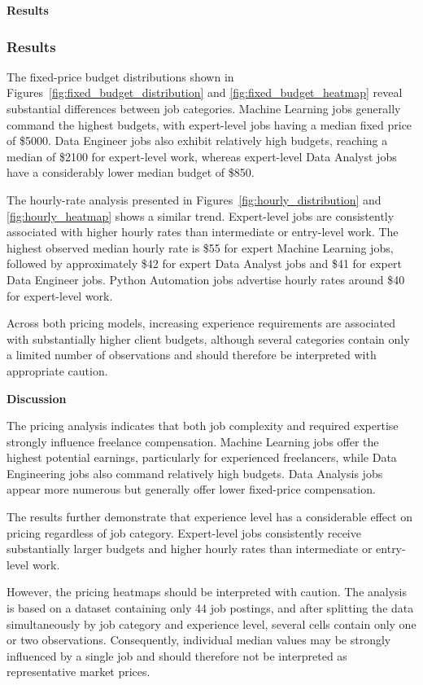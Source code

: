 \medskip

\textbf{Results}

\subsubsection*{Results}

The fixed-price budget distributions shown in Figures~\ref{fig:fixed_budget_distribution} and \ref{fig:fixed_budget_heatmap} reveal substantial
differences between job categories. Machine Learning jobs generally command the highest budgets, with expert-level jobs having a median fixed price of
\$5000. Data Engineer jobs also exhibit relatively high budgets, reaching a median of \$2100 for expert-level work, whereas expert-level Data Analyst
jobs have a considerably lower median budget of \$850.

The hourly-rate analysis presented in Figures~\ref{fig:hourly_distribution} and \ref{fig:hourly_heatmap} shows a similar trend. Expert-level
jobs are consistently associated with higher hourly rates than intermediate or entry-level work. The highest observed median hourly rate is \$55 for
expert Machine Learning jobs, followed by approximately \$42 for expert Data Analyst jobs and \$41 for expert Data Engineer jobs. Python
Automation jobs advertise hourly rates around \$40 for expert-level work.

Across both pricing models, increasing experience requirements are associated with substantially higher client budgets, although several categories
contain only a limited number of observations and should therefore be interpreted with appropriate caution.

\medskip

\textbf{Discussion}

The pricing analysis indicates that both job complexity and required expertise strongly influence freelance compensation. Machine Learning jobs
offer the highest potential earnings, particularly for experienced freelancers, while Data Engineering jobs also command relatively high
budgets. Data Analysis jobs appear more numerous but generally offer lower fixed-price compensation.

The results further demonstrate that experience level has a considerable effect on pricing regardless of job category. Expert-level jobs
consistently receive substantially larger budgets and higher hourly rates than intermediate or entry-level work.

However, the pricing heatmaps should be interpreted with caution. The analysis is based on a dataset containing only 44 job postings, and
after splitting the data simultaneously by job category and experience level, several cells contain only one or two observations. 
Consequently, individual median values may be strongly influenced by a single job and should therefore not be interpreted as
representative market prices.

